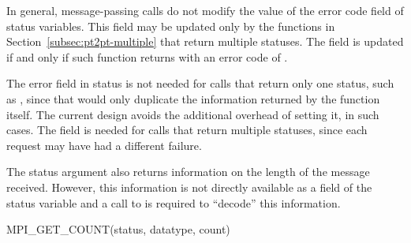 In general, message-passing calls do not modify the value of the error
code field of status variables.  This field may be updated only by
the functions in Section~\ref{subsec:pt2pt-multiple} that return multiple
statuses.  The field is updated if and only if such function returns with
an error code of .

\begin{rationale}
The error field in status is not needed for calls that return only one
status, such as , since that would only duplicate the
information returned by the function itself.  The current design
avoids the additional overhead of setting it, in such cases.  The field
is needed for calls that return multiple statuses, since each request
may have had a different failure.
\end{rationale}

The status argument also returns information on the length of the message
received.  However, this information is not directly available as a field
of the status variable and a call to  is required
to ``decode'' this information.

\begin{funcdef}{MPI\_GET\_COUNT}{(\mbox{status}, \mbox{datatype}, \mbox{count})}
\end{funcdef}

